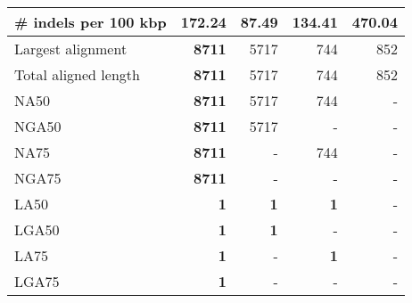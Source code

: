 \documentclass[12pt,a4paper]{article}
\begin{document}
\begin{table}[ht]
\begin{center}
\begin{tabular}{|l*{4}{|r}|}
\# indels per 100 kbp & 172.24 & {\bf 87.49} & 134.41 & 470.04 \\ \hline
Largest alignment & {\bf 8711} & 5717 & 744 & 852 \\ \hline
Total aligned length & {\bf 8711} & 5717 & 744 & 852 \\ \hline
NA50 & {\bf 8711} & 5717 & 744 & - \\ \hline
NGA50 & {\bf 8711} & 5717 & - & - \\ \hline
NA75 & {\bf 8711} & - & 744 & - \\ \hline
NGA75 & {\bf 8711} & - & - & - \\ \hline
LA50 & {\bf 1} & {\bf 1} & {\bf 1} & - \\ \hline
LGA50 & {\bf 1} & {\bf 1} & - & - \\ \hline
LA75 & {\bf 1} & - & {\bf 1} & - \\ \hline
LGA75 & {\bf 1} & - & - & - \\ \hline
\end{tabular}
\end{center}
\end{table}
\end{document}
